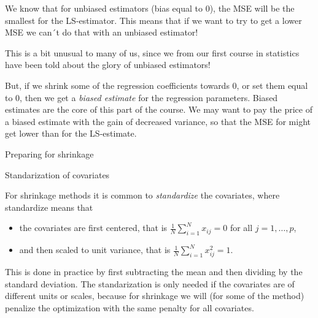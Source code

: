 \documentclass[
  ignorenonframetext,
]{beamer}
\providecommand{\tightlist}{%
  \setlength{\itemsep}{0pt}\setlength{\parskip}{0pt}}
\begin{document}
\begin{frame}

We know that for unbiased estimators (bias equal to \(0\)), the MSE will
be the smallest for the LS-estimator. This means that if we want to try
to get a lower MSE we can´t do that with an unbiased estimator!

This is a bit unusual to many of us, since we from our first course in
statistics have been told about the glory of unbiased estimators!

\end{frame}

\begin{frame}

But, if we shrink some of the regression coefficients towards 0, or set
them equal to 0, then we get a \emph{biased estimate} for the regression
parameters. Biased estimates are the core of this part of the course. We
may want to pay the price of a biased estimate with the gain of
decreased variance, so that the MSE for might get lower than for the
LS-estimate.

\end{frame}

\begin{frame}

\begin{block}{Preparing for shrinkage}

\begin{block}{Standarization of covariates}

For shrinkage methods it is common to \emph{standardize} the covariates,
where standardize means that

\begin{itemize}
\tightlist
\item
  the covariates are first centered, that is
  \(\frac{1}{N}\sum_{i=1}^N x_{ij}=0\) for all \(j=1,\ldots, p\),
\item
  and then scaled to unit variance, that is
  \(\frac{1}{N}\sum_{i=1}^N x^2_{ij}=1\).
\end{itemize}

This is done in practice by first subtracting the mean and then dividing
by the standard deviation. The standarization is only needed if the
covariates are of different units or scales, because for shrinkage we
will (for some of the method) penalize the optimization with the same
penalty for all covariates.

\end{block}

\end{block}

\end{frame}
\end{document}
